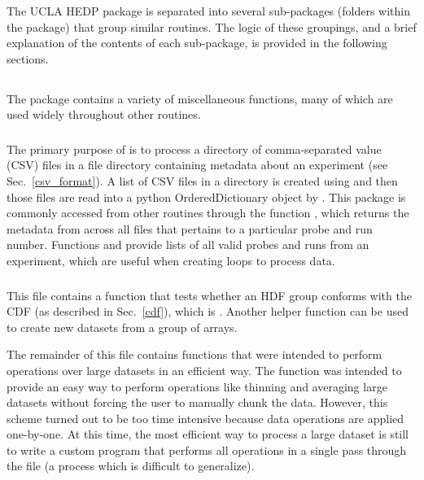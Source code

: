The UCLA HEDP package is separated into several sub-packages (folders within the package) that group similar routines. The logic of these groupings, and a brief explanation of the contents of each sub-package, is provided in the following sections.


\subsection{}

The  package contains a variety of miscellaneous functions, many of which are used widely throughout other routines.
\subsubsection{}

The primary purpose of  is to process a directory of comma-separated value (CSV) files in a file directory containing metadata about an experiment (see Sec.~\ref{csv_format}).  A list of CSV files in a directory is created using  and then those files are read into a python OrderedDictionary object by . This package is commonly accessed from other routines through the function , which returns the metadata from across all files that pertains to a particular probe and run number. Functions  and  provide lists of all valid probes and runs from an experiment, which are useful when creating loops to process data.


\subsubsection{}

This file contains a function that tests whether an HDF group conforms with the CDF (as described in Sec.~\ref{cdf}), which is . Another helper function  can be used to create new datasets from a group of arrays.

The remainder of this file contains functions that were intended to perform operations over large datasets in an efficient way. The function  was intended to provide an easy way to perform operations like thinning and averaging large datasets without forcing the user to manually chunk the data. However, this scheme turned out to be too time intensive because data operations are applied one-by-one. At this time, the most efficient way to process a large dataset is still to write a custom program that performs all operations in a single pass through the file (a process which is difficult to generalize).

